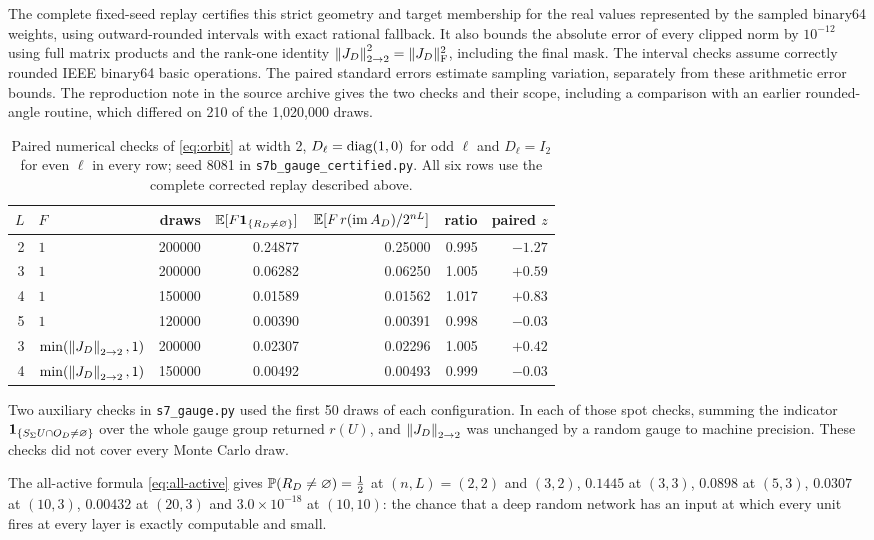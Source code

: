 The complete fixed-seed replay certifies this strict geometry and target membership for the real values represented by the sampled binary64 weights, using outward-rounded intervals with exact rational fallback. It also bounds the absolute error of every clipped norm by $10^{-12}$ using full matrix products and the rank-one identity $\left\lVert J_D\right\rVert_{2\to 2}^2=\|J_D\|_{\mathrm F}^2$, including the final mask. The interval checks assume correctly rounded IEEE binary64 basic operations. The paired standard errors estimate sampling variation, separately from these arithmetic error bounds. The reproduction note in the source archive gives the two checks and their scope, including a comparison with an earlier rounded-angle routine, which differed on 210 of the 1,020,000 draws.

\begin{table}[h]\centering
\begin{tabular}{rlrrrrr}
\toprule
$L$ & $F$ & draws & $\mathbb{E}[F\mathbf{1}_{\{R_D\ne\varnothing\}}]$ & $\mathbb{E}[F\,r(\operatorname{im} A_D)/2^{nL}]$ & ratio & paired $z$\\
\midrule
2 & $1$ & 200000 & 0.24877 & 0.25000 & 0.995 & $-1.27$\\
3 & $1$ & 200000 & 0.06282 & 0.06250 & 1.005 & $+0.59$\\
4 & $1$ & 150000 & 0.01589 & 0.01562 & 1.017 & $+0.83$\\
5 & $1$ & 120000 & 0.00390 & 0.00391 & 0.998 & $-0.03$\\
3 & $\min(\left\lVert J_D\right\rVert_{2\to 2},1)$ & 200000 & 0.02307 & 0.02296 & 1.005 & $+0.42$\\
4 & $\min(\left\lVert J_D\right\rVert_{2\to 2},1)$ & 150000 & 0.00492 & 0.00493 & 0.999 & $-0.03$\\
\bottomrule
\end{tabular}
\caption{Paired numerical checks of \cref{eq:orbit} at width 2, $D_\ell=\operatorname{diag}(1,0)$ for odd $\ell$ and $D_\ell=I_2$ for even $\ell$ in every row; seed 8081 in \texttt{s7b\_gauge\_certified.py}. All six rows use the complete corrected replay described above.}
\label{tab:orbit}
\end{table}

Two auxiliary checks in \texttt{s7\_gauge.py} used the first 50 draws of each configuration. In each of those spot checks, summing the indicator $\mathbf{1}_{\{S_\Sigma U\cap O_D\ne\varnothing\}}$ over the whole gauge group returned $r(U)$, and $\left\lVert J_D\right\rVert_{2\to 2}$ was unchanged by a random gauge to machine precision. These checks did not cover every Monte Carlo draw.

The all-active formula \cref{eq:all-active} gives $\mathbb{P}(R_D\ne\varnothing)=\tfrac12$ at $(n,L)=(2,2)$ and $(3,2)$, $0.1445$ at $(3,3)$, $0.0898$ at $(5,3)$, $0.0307$ at $(10,3)$, $0.00432$ at $(20,3)$ and $3.0\times10^{-18}$ at $(10,10)$: the chance that a deep random network has an input at which every unit fires at every layer is exactly computable and small.


